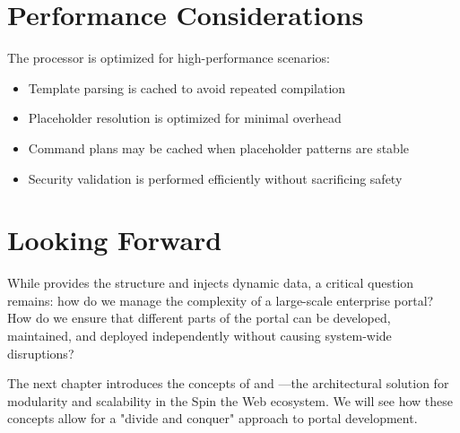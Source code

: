 \section{Performance Considerations}
\label{sec:wbpl-performance}

The \wbpl{} processor is optimized for high-performance scenarios:

\begin{itemize}
\item Template parsing is cached to avoid repeated compilation
\item Placeholder resolution is optimized for minimal overhead
\item Command plans may be cached when placeholder patterns are stable
\item Security validation is performed efficiently without sacrificing safety
\end{itemize}

\section{Looking Forward}
\label{sec:wbpl-forward}

While \wbol{} provides the structure and \wbpl{} injects dynamic data, a critical question remains: how do we manage the complexity of a large-scale enterprise portal? How do we ensure that different parts of the portal can be developed, maintained, and deployed independently without causing system-wide disruptions?

The next chapter introduces the concepts of \textbf{} and \textbf{}—the architectural solution for modularity and scalability in the Spin the Web ecosystem. We will see how these concepts allow for a "divide and conquer" approach to portal development.
